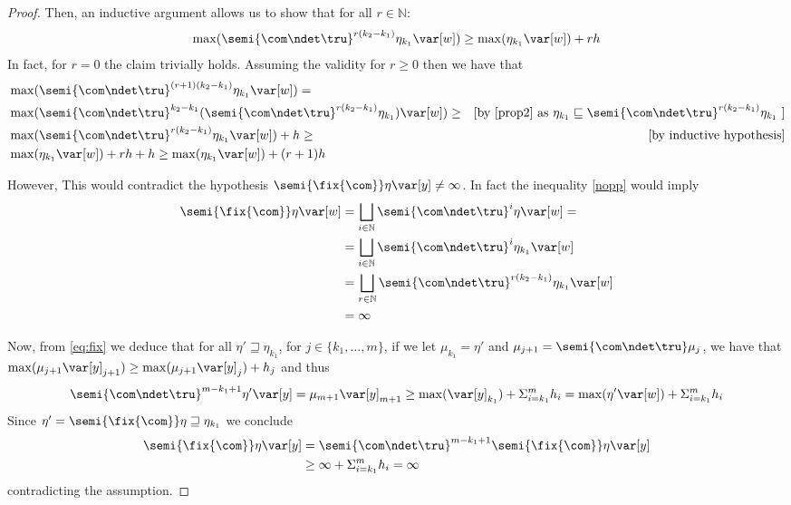 \begin{proof}
  \noindent    
  Then, an inductive argument allows us to show that for all \(r \in \mathbb{N}\):
  \begin{equation}\label{nopp}
    \max(\semi{\com \ndet \tru}^{r(k_2-k_1)} \eta_{k_1} \var[w]) \geq \max(\eta_{k_1}
    \var[w]) + r h
  \end{equation}  
  In fact, for \(r=0\) the claim trivially holds. Assuming the validity for \(r\geq 0\) then we have that
  \begin{align*}    
    & \max(\semi{\com \ndet \tru}^{(r+1)(k_2-k_1)} \eta_{k_1} \var[w]) =\\
    &\max(\semi{\com \ndet \tru}^{k_2-k_1} ( \semi{\com \ndet \tru}^{r(k_2-k_1)} \eta_{k_1}) \var[w]) \geq & \mbox{[by \eqref{prop2} as \(\eta_{k_1} \sqsubseteq \semi{\com \ndet \tru}^{r(k_2-k_1)} \eta_{k_1}\) ]}\\
    &\max(\semi{\com \ndet \tru}^{r(k_2-k_1)} \eta_{k_1} \var[w]) + h \geq & \mbox{[by inductive hypothesis}]\\
    &  \max(\eta_{k_1}\var[w])  + rh + h
    \geq 
    \max(\eta_{k_1}\var[w])  + (r+1)h
  \end{align*}

  \noindent
  However,
  This would contradict the hypothesis \(\semi{\fix{\com}} \eta \var[y] \neq \infty\). In fact the inequality \eqref{nopp} would imply
  \begin{align*}
    \semi{\fix{\com}} \eta \var[w]
    & = \bigsqcup_{i \in \mathbb{N}} \semi{\com
      \ndet \tru}^i \eta \var[w] =\\ 
    & =  \bigsqcup_{i \in \mathbb{N}} \semi{\com \ndet
      \tru}^i \eta_{k_1} \var[w]\\ 
    & = \bigsqcup_{r \in \mathbb{N}} \semi{\com \ndet
      \tru}^{r(k_2-k_1)} \eta_{k_1} \var[w]\\
    & = \infty
  \end{align*}


  Now, from \eqref{eq:fix} we deduce that for all \(\eta' \sqsupseteq \eta_{k_1}\), for 
  \(j \in \{ k_1, \ldots, m\}\), if we let \(\mu_{k_1} = \eta'\) and
  \(\mu_{j+1} = \semi{\com \ndet \tru} \mu_j\), we have that \(\max(\mu_{j+1} \var[y]_{j+1}) \geq \max(\mu_{j+1} \var[y]_{j}) + h_j\) and thus 
  \[
  \semi{\com \ndet \tru}^{m-k_1+1} \eta' \var[y] = \mu_{m+1}
  \var[y]_{m+1} \geq 
  \max(\var[y]_{k_1}) + \Sigma_{i=k_1}^m h_i = \max(\eta' \var[w]) + \Sigma_{i=k_1}^m h_i
  \]
  Since \(\eta' = \semi{\fix{\com}} \eta \sqsupseteq \eta_{k_1}\) we conclude
  \begin{align*}
    \semi{\fix{\com}} \eta \var[y]
    & = \semi{\com \ndet \tru}^{m-k_1+1} \semi{\fix{\com}} \eta \var[y]\\
    & \geq \infty + \Sigma_{i=k_1}^m h_i = \infty
  \end{align*}
  contradicting the assumption.
  

\end{proof}
